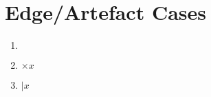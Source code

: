 \documentclass{article}
\begin{document}
\section{Edge/Artefact Cases}
\begin{enumerate}
  \item $\,$  %
  \item $\times x$ %
  \item $\mathbin{|} x$ %
\end{enumerate}
\end{document}
